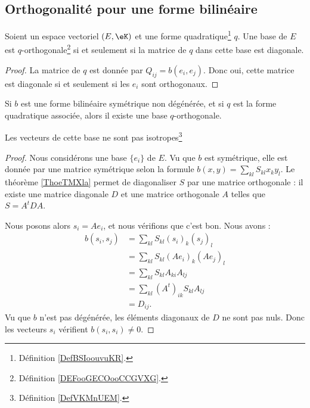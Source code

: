 \subsection{Orthogonalité pour une forme bilinéaire}

\begin{proposition}       \label{PROPooYXMMooYIuGRd}
	Soient un espace vectoriel \( (E,\eK)\) et une forme quadratique\footnote{Définition \ref{DefBSIoouvuKR}.} \( q\). Une base de \( E\) est \( q\)-orthogonale\footnote{Définition \ref{DEFooGECOooCCGVXG}.} si et seulement si la matrice de \( q\) dans cette base est diagonale.
\end{proposition}

\begin{proof}
	La matrice de \( q\) est donnée par \( Q_{ij}=b(e_i,e_j)\). Donc oui, cette matrice est diagonale si et seulement si les \( e_i\) sont orthogonaux.
\end{proof}

\begin{proposition}		\label{PROPooRERSooFHwWtB}
	Si \( b\) est une forme bilinéaire symétrique non dégénérée, et si \( q\) est la forme quadratique associée, alors il existe une base \( q\)-orthogonale.

	Les vecteurs de cette base ne sont pas isotropes\footnote{Définition \ref{DefVKMnUEM}.}
\end{proposition}

\begin{proof}
	Nous considérons une base \( \{e_i\}\) de \( E\). Vu que \( b\) est symétrique, elle est donnée par une matrice symétrique selon la formule \( b(x,y)=\sum_{kl}S_{kl}x_ky_l\). Le théorème \ref{ThoeTMXla} permet de diagonaliser \( S\) par une matrice orthogonale : il existe une matrice diagonale \( D\) et une matrice orthogonale \( A\) telles que \( S=A^tDA\).

	Nous posons alors \( s_i=Ae_i\), et nous vérifions que c'est bon. Nous avons :
	\begin{subequations}
		\begin{align}
			b(s_i,s_j) & =\sum_{kl}S_{kl}(s_i)_k(s_j)_l     \\
			           & =\sum_{kl}S_{kl}(Ae_i)_k(Ae_j)_l   \\
			           & =\sum_{kl}S_{kl}A_{ki}A_{lj}       \\
			           & = \sum_{kl} (A^t)_{ik}S_{kl}A_{lj} \\
			           & =D_{ij}.
		\end{align}
	\end{subequations}
	Vu que \( b\) n'est pas dégénérée, les éléments diagonaux de \( D\) ne sont pas nuls. Donc les vecteurs \( s_i\) vérifient \( b(s_i,s_i)\neq 0\).
\end{proof}

